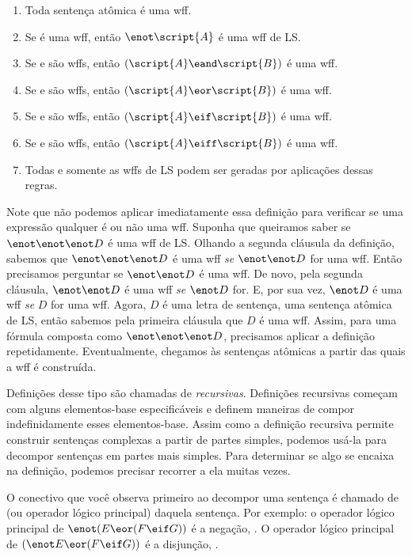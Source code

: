 \begin{enumerate}
\item Toda sentença atômica é uma wff.
\item Se  é uma wff, então $\enot\script{A}$ é uma wff de LS.
\item Se  e  são wffs, então $(\script{A}\eand\script{B})$ é uma wff.
\item Se  e  são wffs, então $(\script{A}\eor\script{B})$ é uma wff.
\item Se  e  são wffs, então $(\script{A}\eif\script{B})$ é uma wff.
\item Se  e  são wffs, então $(\script{A}\eiff\script{B})$ é uma wff.
\item Todas e somente as wffs de LS podem ser geradas por aplicações dessas regras.
\end{enumerate}

Note que não podemos aplicar imediatamente essa definição para verificar se uma expressão qualquer é ou não uma wff. Suponha que queiramos saber se $\enot \enot \enot D$ é uma wff de LS. Olhando a segunda cláusula da definição, sabemos que $\enot \enot \enot D$ é uma wff \emph{se} $\enot \enot D$ for uma wff. Então precisamos perguntar se $\enot \enot D$ é uma wff. De novo, pela segunda cláusula, $\enot \enot D$ é uma wff \emph{se} $\enot D$ for. E, por sua vez, $\enot D$ é uma wff \emph{se} $D$ for uma wff. Agora, $D$ é uma letra de sentença, uma sentença atômica de LS, então sabemos pela primeira cláusula que $D$ é uma wff. Assim, para uma fórmula composta como $\enot \enot \enot D$, precisamos aplicar a definição repetidamente. Eventualmente, chegamos às sentenças atômicas a partir das quais a wff é construída.

Definições desse tipo são chamadas de \emph{recursivas}. Definições recursivas começam com alguns elementos-base especificáveis e definem maneiras de compor indefinidamente esses elementos-base. Assim como a definição recursiva permite construir sentenças complexas a partir de partes simples, podemos usá-la para decompor sentenças em partes mais simples. Para determinar se algo se encaixa na definição, podemos precisar recorrer a ela muitas vezes.

O conectivo que você observa primeiro ao decompor uma sentença é chamado de  (ou operador lógico principal) daquela sentença. Por exemplo: o operador lógico principal de $\enot (E \eor (F \eif G))$ é a negação, \enot. O operador lógico principal de $(\enot E \eor (F \eif G))$ é a disjunção, \eor.


